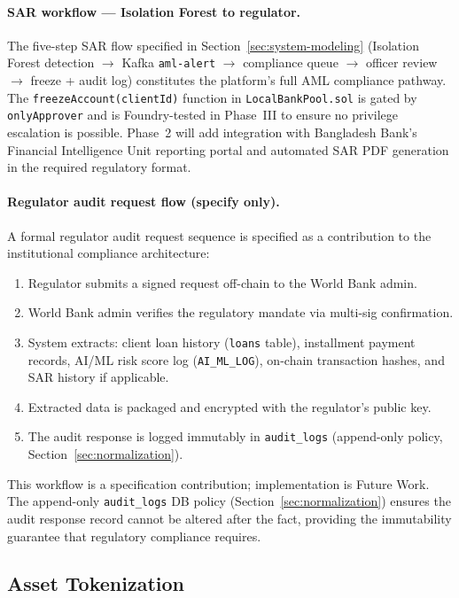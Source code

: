 \documentclass[12pt,a4paper]{report}
\begin{document}
\paragraph{SAR workflow --- Isolation Forest to regulator.}
The five-step SAR flow specified in Section~\ref{sec:system-modeling} (Isolation Forest detection $\to$ Kafka \texttt{aml-alert} $\to$ compliance queue $\to$ officer review $\to$ freeze + audit log) constitutes the platform's full AML compliance pathway. The \texttt{freezeAccount(clientId)} function in \texttt{LocalBankPool.sol} is gated by \texttt{onlyApprover} and is Foundry-tested in Phase~III to ensure no privilege escalation is possible. Phase~2 will add integration with Bangladesh Bank's Financial Intelligence Unit reporting portal and automated SAR PDF generation in the required regulatory format.

\paragraph{Regulator audit request flow (specify only).}
A formal regulator audit request sequence is specified as a contribution to the institutional compliance architecture:

\begin{enumerate}[noitemsep]
\item Regulator submits a signed request off-chain to the World Bank admin.
\item World Bank admin verifies the regulatory mandate via multi-sig confirmation.
\item System extracts: client loan history (\texttt{loans} table), installment payment records, AI/ML risk score log (\texttt{AI\_ML\_LOG}), on-chain transaction hashes, and SAR history if applicable.
\item Extracted data is packaged and encrypted with the regulator's public key.
\item The audit response is logged immutably in \texttt{audit\_logs} (append-only policy, Section~\ref{sec:normalization}).
\end{enumerate}

This workflow is a specification contribution; implementation is Future Work. The append-only \texttt{audit\_logs} DB policy (Section~\ref{sec:normalization}) ensures the audit response record cannot be altered after the fact, providing the immutability guarantee that regulatory compliance requires.

\subsection{Asset Tokenization}
\end{document}
